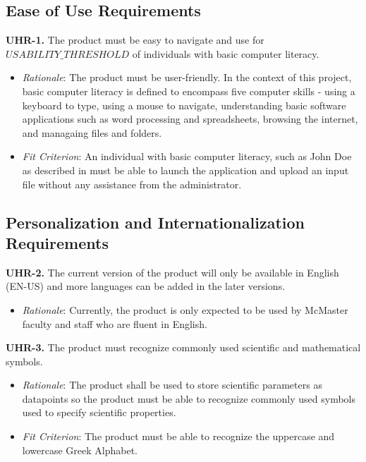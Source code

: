\documentclass[12pt]{article}
\begin{document}
\subsection{Ease of Use Requirements}
\textbf{UHR-1.} The product must be easy to navigate and use for \\ $USABILITY\_THRESHOLD$ of individuals with basic computer literacy.
\begin{itemize}
  \item \emph{Rationale}: The product must be user-friendly. In the context of this project, basic computer literacy is defined to encompass five computer skills - using a keyboard
  to type, using a mouse to navigate, understanding basic software applications such as word processing and spreadsheets, browsing the internet, and managaing files and folders.
  \item \emph{Fit Criterion}: An individual with basic computer literacy, such as John Doe as described in  must be able to launch the application and upload an input file
  without any assistance from the administrator.
\end{itemize}

\subsection{Personalization and Internationalization Requirements}
\textbf{UHR-2.} The current version of the product will only be available in English (EN-US) and more languages can be added in the later versions.
\begin{itemize}
  \item \emph{Rationale}: Currently, the product is only expected to be used by McMaster faculty and staff who are fluent in English.
\end{itemize}
\bigskip
\textbf{UHR-3.} The product must recognize commonly used scientific and mathematical symbols.
\begin{itemize}
  \item \emph{Rationale}: The product shall be used to store scientific parameters as datapoints so the product must be able to recognize commonly used symbols used to specify scientific properties.
  \item \emph{Fit Criterion}: The product must be able to recognize the uppercase and lowercase Greek Alphabet.
\end{itemize}
\end{document}
